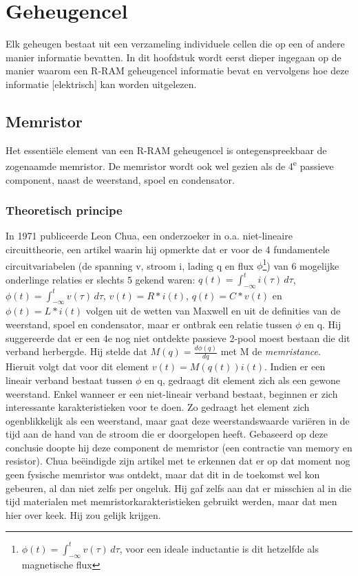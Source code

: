 \chapter{Geheugencel}
\label{cell}
Elk geheugen bestaat uit een verzameling individuele cellen die op een of andere manier informatie bevatten.
In dit hoofdstuk wordt eerst dieper ingegaan op de manier waarom een R-RAM geheugencel informatie bevat en vervolgens hoe deze informatie [elektrisch] kan worden uitgelezen.

\section{Memristor}
Het essentiële element van een R-RAM geheugencel is ontegenspreekbaar de zogenaamde memristor.
De memristor wordt ook wel gezien als de 4\textsuperscript{e} passieve component, naast de weerstand, spoel en condensator.

\subsection{Theoretisch principe}
In 1971 publiceerde Leon Chua, een onderzoeker in o.a. niet-lineaire circuittheorie, een artikel waarin hij opmerkte dat er voor de 4 fundamentele circuitvariabelen (de spanning v, stroom i, lading q en flux $\phi$\footnote{$\phi(t) =  \int^{t}_{-\infty} v(\tau) \, d\tau $, voor een ideale inductantie is dit hetzelfde als magnetische flux}) van 6 mogelijke onderlinge relaties er slechts 5 gekend waren: $q(t) =  \int^{t}_{-\infty} i(\tau) \, d\tau $, $\phi(t) =  \int^{t}_{-\infty} v(\tau) \, d\tau $, $v(t)=R*i(t)$, $q(t)=C*v(t)$ en $\phi(t) = L*i(t)$ volgen uit de wetten van Maxwell en uit de definities van de weerstand, spoel en condensator, maar er ontbrak een relatie tussen $\phi$ en q.\cite{Chu71} Hij suggereerde dat er een 4e nog niet ontdekte passieve 2-pool moest bestaan die dit verband herbergde. Hij stelde dat $M(q)= \frac{d\phi(q)}{dq}$ met M de \emph{memristance}.
Hieruit volgt dat voor dit element $v(t)=M(q(t)) i(t)$. Indien er een lineair verband bestaat tussen $\phi$ en q, gedraagt dit element zich als een gewone weerstand. Enkel wanneer er een niet-lineair verband bestaat, beginnen er zich interessante karakteristieken voor te doen. Zo gedraagt het element zich ogenblikkelijk als een weerstand, maar gaat deze weerstandswaarde variëren in de tijd aan de hand van de stroom die er doorgelopen heeft.
Gebaseerd op deze conclusie doopte hij deze component de memristor (een contractie van memory en resistor).
Chua beëindigde zijn artikel met te erkennen dat er op dat moment nog geen fysische memristor was ontdekt, maar dat dit in de toekomst wel kon gebeuren, al dan niet zelfs per ongeluk. Hij gaf zelfs aan dat er misschien al in die tijd materialen met memristorkarakteristieken gebruikt werden, maar dat men hier over keek. Hij zou gelijk krijgen.

